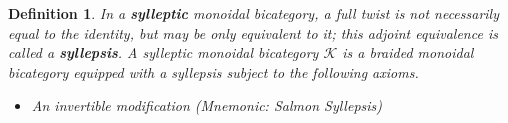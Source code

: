 \documentclass[12pt,twoside,openright]{report}
\newtheorem{defn}{Definition}
\newcommand{\C}{ {\mathcal{K}}  }
\begin{document}
\begin{defn}
  In a {\bf sylleptic} monoidal bicategory, a full twist is not necessarily equal to the identity, but may be only equivalent to it; 
this adjoint equivalence is called a {\bf syllepsis}. A sylleptic monoidal bicategory $\C$ is a braided monoidal bicategory equipped with a syllepsis subject to the following axioms. \\
  \begin{itemize} 
    \item An invertible modification (Mnemonic: Salmon Syllepsis)
    \begin{center}
    \end{center}
  \end{itemize}
  

\end{defn}
\end{document}
